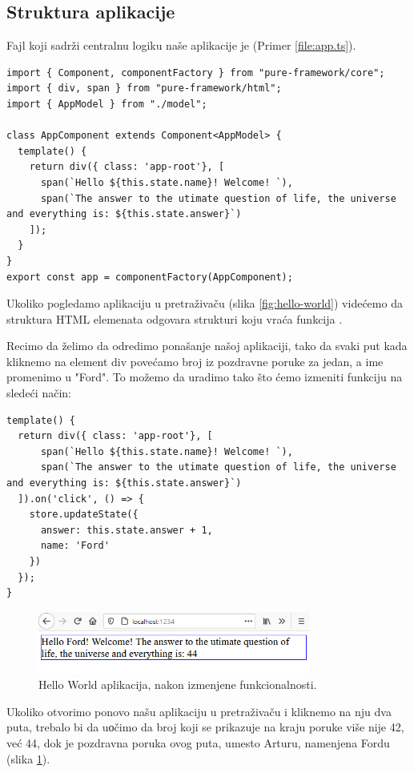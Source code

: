\documentclass[12pt,oneside]{memoir}
\newcommand{\code}[1]{\colorbox{codegray}{\texttt{\scalebox{0.9}{#1}}}}%
\begin{document}
\subsection{Struktura aplikacije}

Fajl koji sadrži centralnu logiku naše aplikacije je \code{src/App.ts} (Primer \ref{file:app.ts}).
\begin{lstlisting}[style=jsStyle, caption={Sadržaj fajla \code{App.ts}},label=file:app.ts]
import { Component, componentFactory } from "pure-framework/core";
import { div, span } from "pure-framework/html";
import { AppModel } from "./model";

class AppComponent extends Component<AppModel> {
  template() {
    return div({ class: 'app-root'}, [
      span(`Hello ${this.state.name}! Welcome! `),
      span(`The answer to the utimate question of life, the universe and everything is: ${this.state.answer}`)
    ]);
  }
}
export const app = componentFactory(AppComponent);
\end{lstlisting}
\noindent
Ukoliko pogledamo aplikaciju u pretraživaču (slika \ref{fig:hello-world})
videćemo da struktura HTML elemenata odgovara strukturi koju vraća funkcija \code{template()}.

Recimo da želimo da odredimo ponašanje našoj aplikaciji, tako da svaki put kada
kliknemo na element div povećamo broj iz pozdravne poruke za jedan, a ime promenimo u "Ford".
To možemo da uradimo tako što ćemo izmeniti funkciju \code{template()} na sledeći način:

\begin{lstlisting}[style=jsStyle, firstnumber=6, caption={Fajl \code{App.ts} nakon izmenjene funkcionalnosti},label=file:app.ts:2]
template() {
  return div({ class: 'app-root'}, [
      span(`Hello ${this.state.name}! Welcome! `),
      span(`The answer to the utimate question of life, the universe and everything is: ${this.state.answer}`)
  ]).on('click', () => {
    store.updateState({
      answer: this.state.answer + 1,
      name: 'Ford'
    })
  });
}
\end{lstlisting}
\begin{figure}[!ht]
  \centering
  \includegraphics[width=0.8\textwidth]{slike/hello-ford.PNG}
  \caption{Hello World aplikacija, nakon izmenjene funkcionalnosti.}
  \label{fig:hello-ford}
\end{figure}
\noindent
Ukoliko otvorimo ponovo našu aplikaciju u pretraživaču i kliknemo na nju dva puta,
trebalo bi da uоčimo da broj koji se prikazuje na kraju poruke više nije 42, već 44,
dok je pozdravna poruka ovog puta, umesto Arturu, namenjena Fordu (slika \ref{fig:hello-ford}).
\end{document}
